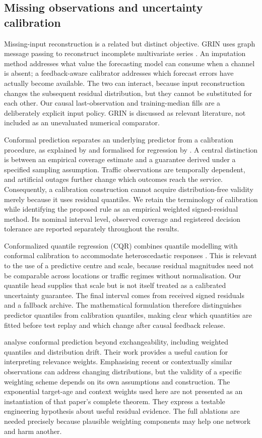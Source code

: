 \documentclass[pdflatex,sn-mathphys-num]{sn-jnl}
\begin{document}
\subsection{Missing observations and uncertainty calibration}
Missing-input reconstruction is a related but distinct objective. GRIN uses graph message passing to reconstruct incomplete multivariate series \citep{cini2022}. An imputation method addresses what value the forecasting model can consume when a channel is absent; a feedback-aware calibrator addresses which forecast errors have actually become available. The two can interact, because input reconstruction changes the subsequent residual distribution, but they cannot be substituted for each other. Our causal last-observation and training-median fills are a deliberately explicit input policy. GRIN is discussed as relevant literature, not included as an unevaluated numerical comparator.

Conformal prediction separates an underlying predictor from a calibration procedure, as explained by \citet{angelopoulos2023} and formalised for regression by \citet{lei2018}. A central distinction is between an empirical coverage estimate and a guarantee derived under a specified sampling assumption. Traffic observations are temporally dependent, and artificial outages further change which outcomes reach the service. Consequently, a calibration construction cannot acquire distribution-free validity merely because it uses residual quantiles. We retain the terminology of calibration while identifying the proposed rule as an empirical weighted signed-residual method. Its nominal interval level, observed coverage and registered decision tolerance are reported separately throughout the results.

Conformalized quantile regression (CQR) combines quantile modelling with conformal calibration to accommodate heteroscedastic responses \citep{romano2019}. This is relevant to the use of a predictive centre and scale, because residual magnitudes need not be comparable across locations or traffic regimes without normalisation. Our quantile head supplies that scale but is not itself treated as a calibrated uncertainty guarantee. The final interval comes from received signed residuals and a fallback archive. The mathematical formulation therefore distinguishes predictor quantiles from calibration quantiles, making clear which quantities are fitted before test replay and which change after causal feedback release.

\citet{barber2023} analyse conformal prediction beyond exchangeability, including weighted quantiles and distribution drift. Their work provides a useful caution for interpreting relevance weights. Emphasising recent or contextually similar observations can address changing distributions, but the validity of a specific weighting scheme depends on its own assumptions and construction. The exponential target-age and context weights used here are not presented as an instantiation of that paper's complete theorem. They express a testable engineering hypothesis about useful residual evidence. The full ablations are needed precisely because plausible weighting components may help one network and harm another.
\end{document}
